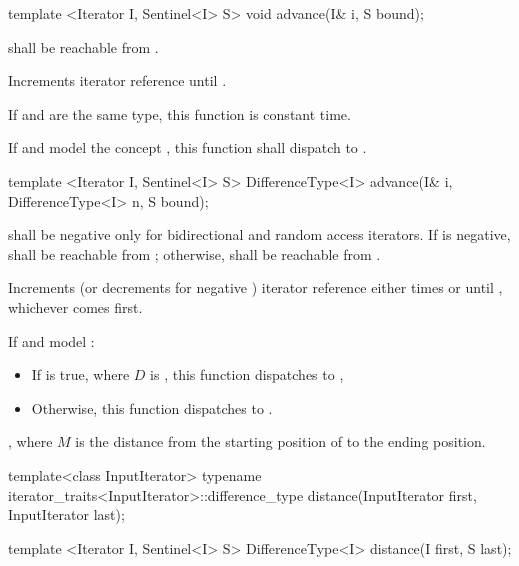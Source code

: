 \begin{addedblock}
\begin{itemdecl}
template <Iterator I, Sentinel<I> S>
  void advance(I& i, S bound);
\end{itemdecl}

\begin{itemdescr}
\pnum
\requires
{} shall be reachable from .

\pnum
\effects
Increments iterator reference  until
.

\pnum
If  and  are the same type, this function
is constant time.

\pnum
If  and  model the concept , this
function shall dispatch to .
\end{itemdescr}

\begin{itemdecl}
template <Iterator I, Sentinel<I> S>
  DifferenceType<I> advance(I& i, DifferenceType<I> n, S bound);
\end{itemdecl}

\begin{itemdescr}
\pnum
\requires
{}
shall be negative only for bidirectional and random access iterators. If  is
negative,  shall be reachable from ; otherwise, 
shall be reachable from .

\pnum
\effects
Increments (or decrements for negative ) iterator reference  either
 times or until , whichever comes first.

\pnum
If  and  model :

\begin{itemize}
\item If  is true, where $D$ is ,
this function dispatches to ,
\item Otherwise, this function dispatches to .
\end{itemize}

\pnum
\returns
{}, where $M$ is the distance from the starting position of  to
the ending position.
\end{itemdescr}
\end{addedblock}

%
\begin{removedblock}
\begin{itemdecl}
  template<class InputIterator>
      typename iterator_traits<InputIterator>::difference_type
         distance(InputIterator first, InputIterator last);
\end{itemdecl}
\end{removedblock}
\begin{addedblock}
\begin{itemdecl}
template <Iterator I, Sentinel<I> S>
  DifferenceType<I> distance(I first, S last);
\end{itemdecl}
\end{addedblock}

